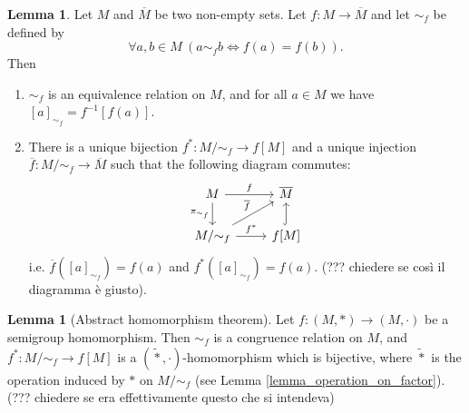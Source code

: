 \documentclass[12pt,a4paper]{report}
\theoremstyle{definition}
\newtheorem{lemma}[theorem]{Lemma}
\theoremstyle{num.custom-title}
\newcommand{\ol}{\overline}
\renewcommand{\iff}{\Leftrightarrow}
\begin{document}
\begin{lemma}
Let $M$ and $\ol{M}$ be two non-empty sets. Let $f: M \to \ol{M}$ and let $\sim_f$ be defined by
\[
\forall a,b \in M \ (a \sim_f b \iff f(a) = f(b)).
\]
Then
\begin{enumerate}
\item $\sim_f$ is an equivalence relation on $M$, and for all $a \in M$ we have $[a]_{\sim_f} = f^{-1}[f(a)]$.
\item There is a unique bijection $f^* : M/{\sim_f} \to f[M]$ and a unique injection $\ol{f}: M/{\sim_f} \to \ol{M}$ such that the following diagram commutes:
\[
\begin{tikzcd}
M \arrow{r}{f} \arrow[swap]{d}{\pi_{\sim_f}} & \ol{M} \\
M/{\sim_f} \arrow{ur}{\ol{f}} \arrow{r}{f^*} & f[M] \arrow[hookrightarrow]{u}{}
\end{tikzcd}
\]
i.e. $\ol{f}([a]_{\sim_f}) = f(a)$ and $f^*([a]_{\sim_f})=f(a)$. (??? chiedere se così il diagramma è giusto).
\end{enumerate}
\end{lemma}

\begin{lemma}[Abstract homomorphism theorem]
Let $f: (M,*) \to (M,\cdot)$ be a semigroup homomorphism. Then $\sim_f$ is a congruence relation on $M$, and $f^* \colon M/{\sim_f} \to f[M]$ is a $(\tilde{*}, \cdot)$-homomorphism which is bijective, where $\tilde{*}$ is the operation induced by $*$ on $M/{\sim_f}$ (see Lemma \ref{lemma_operation_on_factor}). (??? chiedere se era effettivamente questo che si intendeva)
\end{lemma}
\end{document}
